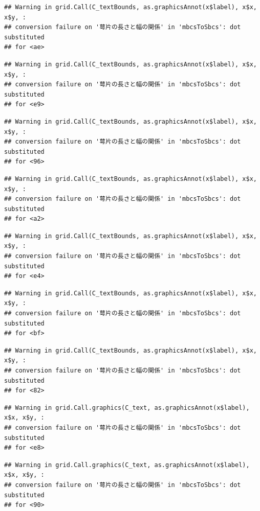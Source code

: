 \documentclass[
]{book}
\begin{document}
\begin{verbatim}
## Warning in grid.Call(C_textBounds, as.graphicsAnnot(x$label), x$x, x$y, :
## conversion failure on '萼片の長さと幅の関係' in 'mbcsToSbcs': dot substituted
## for <ae>
\end{verbatim}

\begin{verbatim}
## Warning in grid.Call(C_textBounds, as.graphicsAnnot(x$label), x$x, x$y, :
## conversion failure on '萼片の長さと幅の関係' in 'mbcsToSbcs': dot substituted
## for <e9>
\end{verbatim}

\begin{verbatim}
## Warning in grid.Call(C_textBounds, as.graphicsAnnot(x$label), x$x, x$y, :
## conversion failure on '萼片の長さと幅の関係' in 'mbcsToSbcs': dot substituted
## for <96>
\end{verbatim}

\begin{verbatim}
## Warning in grid.Call(C_textBounds, as.graphicsAnnot(x$label), x$x, x$y, :
## conversion failure on '萼片の長さと幅の関係' in 'mbcsToSbcs': dot substituted
## for <a2>
\end{verbatim}

\begin{verbatim}
## Warning in grid.Call(C_textBounds, as.graphicsAnnot(x$label), x$x, x$y, :
## conversion failure on '萼片の長さと幅の関係' in 'mbcsToSbcs': dot substituted
## for <e4>
\end{verbatim}

\begin{verbatim}
## Warning in grid.Call(C_textBounds, as.graphicsAnnot(x$label), x$x, x$y, :
## conversion failure on '萼片の長さと幅の関係' in 'mbcsToSbcs': dot substituted
## for <bf>
\end{verbatim}

\begin{verbatim}
## Warning in grid.Call(C_textBounds, as.graphicsAnnot(x$label), x$x, x$y, :
## conversion failure on '萼片の長さと幅の関係' in 'mbcsToSbcs': dot substituted
## for <82>
\end{verbatim}

\begin{verbatim}
## Warning in grid.Call.graphics(C_text, as.graphicsAnnot(x$label), x$x, x$y, :
## conversion failure on '萼片の長さと幅の関係' in 'mbcsToSbcs': dot substituted
## for <e8>
\end{verbatim}

\begin{verbatim}
## Warning in grid.Call.graphics(C_text, as.graphicsAnnot(x$label), x$x, x$y, :
## conversion failure on '萼片の長さと幅の関係' in 'mbcsToSbcs': dot substituted
## for <90>
\end{verbatim}
\end{document}

